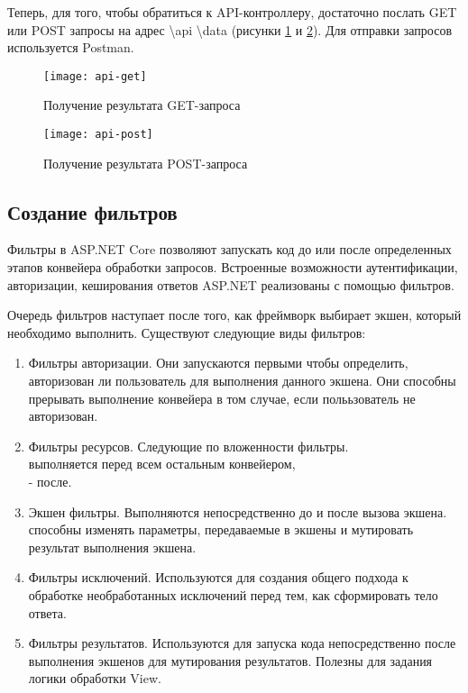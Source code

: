 \documentclass[a4paper,14pt]{extarticle}
\begin{document}
Теперь, для того, чтобы обратиться к API-контроллеру, достаточно послать GET или
POST запросы на адрес \textbackslash api \textbackslash data (рисунки
\ref{fig:api-get} и \ref{fig:api-post}). Для отправки запросов используется
Postman.

\begin{figure}[H]
    \centering
    \texttt{[image: api-get]}
    \caption{Получение результата GET-запроса}
    \label{fig:api-get}
\end{figure}

\begin{figure}[H]
    \centering
    \texttt{[image: api-post]}
    \caption{Получение результата POST-запроса}
    \label{fig:api-post}
\end{figure}

\subsection{Создание фильтров}

Фильтры в ASP.NET Core позволяют запускать код до или после определенных этапов
конвейера обработки запросов. Встроенные возможности аутентификации,
авторизации, кеширования ответов ASP.NET реализованы с помощью фильтров.

Очередь фильтров наступает после того, как фреймворк выбирает экшен, который
необходимо выполнить. Существуют следующие виды фильтров:

\begin{enumerate}
    \item Фильтры авторизации. Они запускаются первыми чтобы определить,
          авторизован ли пользователь для выполнения данного экшена. Они способны
          прерывать выполнение конвейера в том случае, если полььзователь не
          авторизован.
    \item Фильтры ресурсов. Следующие по вложенности фильтры.\\
           выполняется перед всем остальным
          конвейером,\\ - после.
    \item Экшен фильтры. Выполняются непосредственно до и после вызова экшена.
          способны изменять параметры, передаваемые в экшены и мутировать
          результат выполнения экшена.
    \item Фильтры исключений. Используются для создания общего подхода к обработке
          необработанных исключений перед тем, как сформировать тело ответа.
    \item Фильтры результатов. Используются для запуска кода непосредственно после
          выполнения экшенов для мутирования результатов. Полезны для задания логики
          обработки View.
\end{enumerate}
\end{document}
